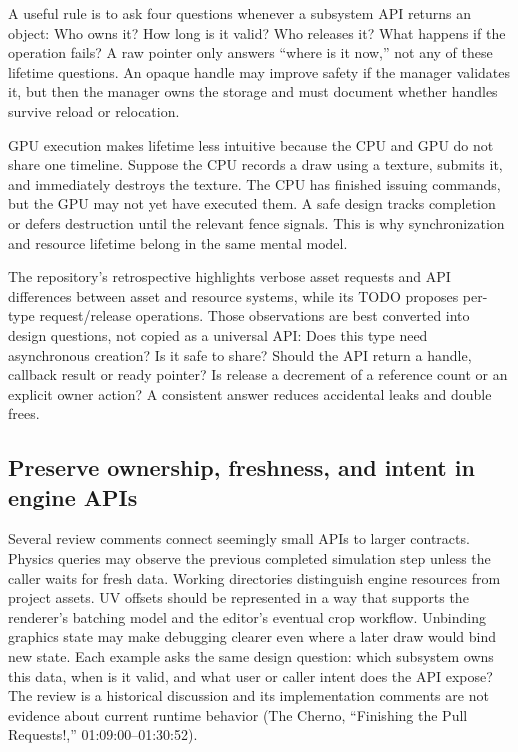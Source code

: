 A useful rule is to ask four questions whenever a subsystem API returns an object: Who owns it? How long is it valid? Who releases it? What happens if the operation fails? A raw pointer only answers ``where is it now,'' not any of these lifetime questions. An opaque handle may improve safety if the manager validates it, but then the manager owns the storage and must document whether handles survive reload or relocation.

GPU execution makes lifetime less intuitive because the CPU and GPU do not share one timeline. Suppose the CPU records a draw using a texture, submits it, and immediately destroys the texture. The CPU has finished issuing commands, but the GPU may not yet have executed them. A safe design tracks completion or defers destruction until the relevant fence signals. This is why synchronization and resource lifetime belong in the same mental model.

The repository's retrospective highlights verbose asset requests and API differences between asset and resource systems, while its TODO proposes per-type request/release operations. Those observations are best converted into design questions, not copied as a universal API: Does this type need asynchronous creation? Is it safe to share? Should the API return a handle, callback result or ready pointer? Is release a decrement of a reference count or an explicit owner action? A consistent answer reduces accidental leaks and double frees.

\subsection{Preserve ownership, freshness, and intent in engine APIs}\label{05-engine-i-ch014-preserve-ownership-freshness-and-intent-in-engine-apis}

Several review comments connect seemingly small APIs to larger contracts. Physics queries may observe the previous completed simulation step unless the caller waits for fresh data. Working directories distinguish engine resources from project assets. UV offsets should be represented in a way that supports the renderer's batching model and the editor's eventual crop workflow. Unbinding graphics state may make debugging clearer even where a later draw would bind new state. Each example asks the same design question: which subsystem owns this data, when is it valid, and what user or caller intent does the API expose? The review is a historical discussion and its implementation comments are not evidence about current runtime behavior (The Cherno, ``Finishing the Pull Requests!,'' 01:09:00--01:30:52).

